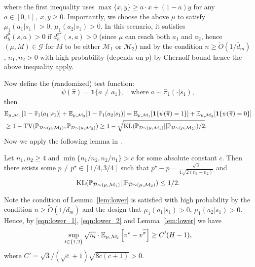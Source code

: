 where the first inequality uses $\max \{x, y\} \geq a \cdot x+(1-a) y$ for any $a\in[0,1],\;x,y\geq 0$. Importantly, we choose the above $\mu$ to satisfy $\mu_1(a_1|s_1)>0$, $\mu_1(a_2|s_1)>0$. In this scenario, it satisfies $d^\mu_h(s,a)>0\;\text{if}\;d^{\pi^\star}_h(s,a)>0$ (since $\mu$ can reach both $a_1$ and $a_2$, hence $(\mu,M)\in\mathcal{G}$ for $M$ to be either $\mathcal{M}_1$ or $\mathcal{M}_2$) and by the condition $n\geq \widetilde{O}(1/\bar{d}_m)$, $n_1,n_2>0$ with high probability (depends on $p$) by Chernoff bound hence the above inequality apply. 

Now define the (randomized) test function:
\[
\psi(\widehat{\pi})=\mathbf{1}\{a\neq a_1\},\quad \text{where} \; a\sim\widehat{\pi}_1(\cdot|s_1),
\]
then 
\begin{equation}\label{eqn:lower_2}
\begin{aligned}
&\E_{\mu,\mathcal{M}_1}[1-\widehat{\pi}_1(a_1|s_1)]+\E_{\mu,\mathcal{M}_2}[1-\widehat{\pi}_1(a_2|s_1)]=\E_{\mu,\mathcal{M}_1}[\mathbf{1}\{\psi(\widehat{\pi})=1\}]+\E_{\mu,\mathcal{M}_2}[\mathbf{1}\{\psi(\widehat{\pi})=0\}]\\
&\geq 1-\mathrm{TV}(\P_{\mathcal{D}\sim(\mu,\mathcal{M}_1)},\P_{\mathcal{D}\sim(\mu,\mathcal{M}_2)})\geq 1-\sqrt{\mathrm{KL}(\P_{\mathcal{D}\sim(\mu,\mathcal{M}_1)}||\P_{\mathcal{D}\sim(\mu,\mathcal{M}_2)})/2}.
\end{aligned}
\end{equation}
Now we apply the following lemma in \cite{jin2020pessimism}.

\begin{lemma}\label{lem:lower}
	Let $n_1,n_2\geq 4$ and $\min\{n_1/n_2,n_2/n_1\}>c$ for some absolute constant $c$. Then there exists some $p\neq p^\star\in[1/4,3/4]$ such that $p^\star-p=\frac{\sqrt{3}}{4\sqrt{2(n_1+n_2)}}$ and 
	\[
	\mathrm{KL}(\P_{\mathcal{D}\sim(\mu,\mathcal{M}_1)}||\P_{\mathcal{D}\sim(\mu,\mathcal{M}_2)})\leq 1/2.
	\]
\end{lemma}
Note the condition of Lemma~\ref{lem:lower} is satisfied with high probability by the condition $n\geq \widetilde{O}(1/\bar{d}_m)$ and the design that $\mu_1(a_1|s_1)>0$, $\mu_1(a_2|s_1)>0$. Hence, by \eqref{eqn:lower_1}, \eqref{eqn:lower_2} and Lemma~\ref{lem:lower} we have 
\begin{equation}\label{eqn:lower_inter_minimax}
\sup_{l\in\{1,2\}}\sqrt{n_l}\cdot\E_{\mu,\mathcal{M}_l}\left[v^\star-v^{\widehat{\pi}}\right]\geq C'(H-1),
\end{equation}
where $C'=\sqrt{3}/(\sqrt{c}+1)\sqrt{8c(c+1)}>0$. 

